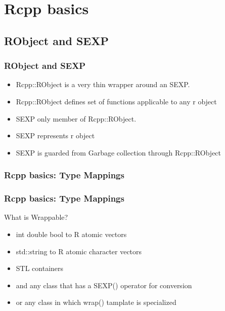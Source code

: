 \documentclass[hyperef={
    colorlinks=true,
    linkcolor=blue,
    filecolor=black,
urlcolor=blue}
]{beamer}
\begin{document}
\section{Rcpp basics}
\subsection{RObject and SEXP}
\begin{frame}
\frametitle{RObject and SEXP}
\begin{itemize}
    \item Rcpp::RObject is a very thin wrapper around an SEXP. 
    \item Rcpp::RObject defines set of functions applicable to any r object
    \item SEXP only member of Rcpp::RObject.
    \item SEXP represents r object
    \item SEXP is guarded from Garbage collection through Rcpp::RObject
\end{itemize}
\end{frame}        

\subsubsection{Rcpp basics: Type Mappings}
\begin{frame}
\frametitle{Rcpp basics: Type Mappings}
    What is Wrappable?
\begin{itemize}
    \item int double bool to R atomic vectors
    \item std::string to R atomic character vectors
    \item STL containers
    \item and any class that has a SEXP() operator for conversion
    \item or any class in which wrap() tamplate is specialized
\end{itemize}
\end{frame}

\end{document}
